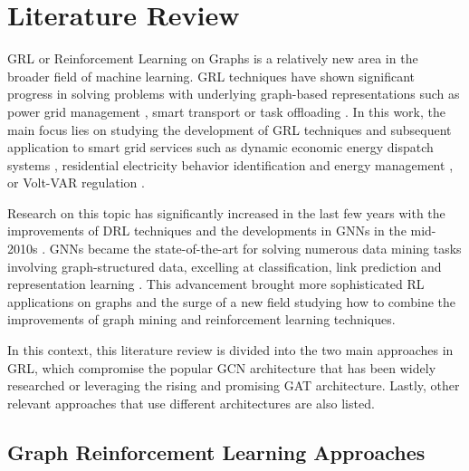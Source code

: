 \chapter{Literature Review} \label{chap:literature-review}

\ac{GRL} or Reinforcement Learning on Graphs is a relatively new area in the broader field of machine learning. \ac{GRL} techniques have shown significant progress in solving problems with underlying graph-based representations such as power grid management \cite{liNovelGraphReinforcement2022, chenGraphRepresentationLearningbased2023}, smart transport \cite{xingBilevelGraphReinforcement2023, almasanDeepReinforcementLearning2022} or task offloading \cite{gaoFastAdaptiveTask2023, liGraphReinforcementLearningbased2022}. In this work, the main focus lies on studying the development of \ac{GRL} techniques and subsequent application to smart grid services such as dynamic economic energy dispatch systems \cite{chenScalableGraphReinforcement2023, xingRealtimeOptimalScheduling2023}, residential electricity behavior identification and energy management \cite{chenGraphRepresentationLearningbased2023}, or Volt-VAR regulation \cite{huMultiagentGraphReinforcement2024}.  \par
Research on this topic has significantly increased in the last few years with the improvements of \ac{DRL} techniques and the developments in \acp{GNN} in the mid-2010s \cite{kipfSemiSupervisedClassificationGraph2017, velickovicGraphAttentionNetworks2018, liGatedGraphSequence2016, gaoGraphUNets2019}. \acp{GNN} became the state-of-the-art for solving numerous data mining tasks involving graph-structured data, excelling at classification, link prediction and representation learning \cite{xuHowPowerfulAre2019, nieReinforcementLearningGraphs2023}. This advancement brought more sophisticated \ac{RL} applications on graphs and the surge of a new field studying how to combine the improvements of graph mining and reinforcement learning techniques. \par
In this context, this literature review is divided into the two main approaches in \ac{GRL}, which compromise the popular \ac{GCN} architecture that has been widely researched or leveraging the rising and promising \ac{GAT} architecture. Lastly, other relevant approaches that use different architectures are also listed.

\section{Graph Reinforcement Learning Approaches}

